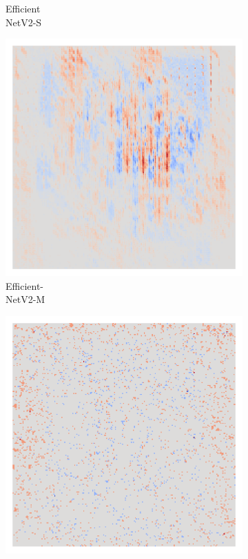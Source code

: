 \begin{figure}[H]
\begin{subfigure}{0.16\linewidth}
        \caption{Efficient\\NetV2-S}
    \end{subfigure}\hfill%
    \begin{subfigure}{0.16\linewidth}
        \centering
        \includegraphics[height=1\linewidth]{01-images/05-resultate/uap_efficientnet_m/uap0-efficientnet_v2_m-mri_data-n200-robustificationslevel0.png}
        \caption{Efficient-\\NetV2-M}
    \end{subfigure}\hfill%
    \begin{subfigure}{0.16\linewidth}
        \centering
        \includegraphics[height=1\linewidth]{01-images/05-resultate/uap_resnet18/uap0-resnet18-mri_data-n200-robustificationslevel0.png}

\end{subfigure}
\end{figure}
